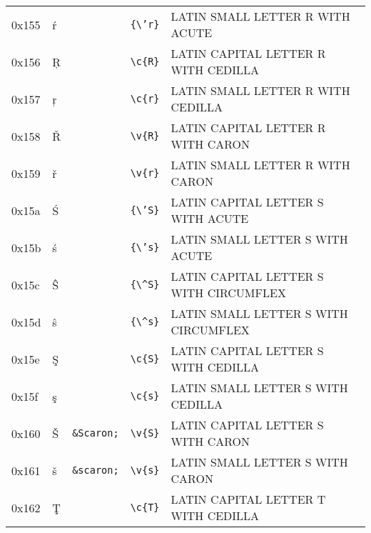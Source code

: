 \documentclass[a4paper,10pt]{article}
\begin{document}
{\begin{center}
\begin{xtabular}{llllp{10cm}}
0x155  & {\'r}                  & \texttt{}           & \texttt{\{{\textbackslash}'r\}}                        & LATIN SMALL LETTER R WITH ACUTE            \\
0x156  & \c{R}                  & \texttt{}           & \texttt{{\textbackslash}c\{R\}}                        & LATIN CAPITAL LETTER R WITH CEDILLA        \\
0x157  & \c{r}                  & \texttt{}           & \texttt{{\textbackslash}c\{r\}}                        & LATIN SMALL LETTER R WITH CEDILLA          \\
0x158  & \v{R}                  & \texttt{}           & \texttt{{\textbackslash}v\{R\}}                        & LATIN CAPITAL LETTER R WITH CARON          \\
0x159  & \v{r}                  & \texttt{}           & \texttt{{\textbackslash}v\{r\}}                        & LATIN SMALL LETTER R WITH CARON            \\
0x15a  & {\'S}                  & \texttt{}           & \texttt{\{{\textbackslash}'S\}}                        & LATIN CAPITAL LETTER S WITH ACUTE          \\
0x15b  & {\'s}                  & \texttt{}           & \texttt{\{{\textbackslash}'s\}}                        & LATIN SMALL LETTER S WITH ACUTE            \\
0x15c  & {\^S}                  & \texttt{}           & \texttt{\{{\textbackslash}\^{ }S\}}                    & LATIN CAPITAL LETTER S WITH CIRCUMFLEX     \\
0x15d  & {\^s}                  & \texttt{}           & \texttt{\{{\textbackslash}\^{ }s\}}                    & LATIN SMALL LETTER S WITH CIRCUMFLEX       \\
0x15e  & \c{S}                  & \texttt{}           & \texttt{{\textbackslash}c\{S\}}                        & LATIN CAPITAL LETTER S WITH CEDILLA        \\
0x15f  & \c{s}                  & \texttt{}           & \texttt{{\textbackslash}c\{s\}}                        & LATIN SMALL LETTER S WITH CEDILLA          \\
0x160  & \v{S}                  & \texttt{\&Scaron;}  & \texttt{{\textbackslash}v\{S\}}                        & LATIN CAPITAL LETTER S WITH CARON          \\
0x161  & \v{s}                  & \texttt{\&scaron;}  & \texttt{{\textbackslash}v\{s\}}                        & LATIN SMALL LETTER S WITH CARON            \\
0x162  & \c{T}                  & \texttt{}           & \texttt{{\textbackslash}c\{T\}}                        & LATIN CAPITAL LETTER T WITH CEDILLA        \\

\end{xtabular}
\end{center}}
\end{document}
